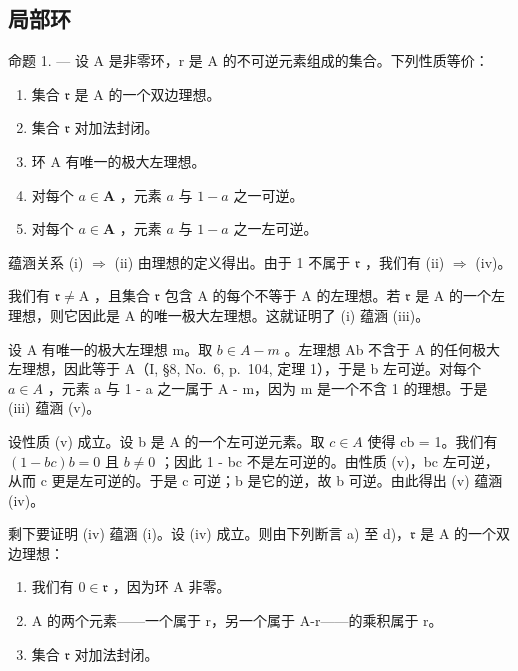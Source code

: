 \subsection{局部环}

命题 1. --- 设 A 是非零环，r 是 A 的不可逆元素组成的集合。下列性质等价：

\begin{enumerate}
\def\labelenumi{(\roman{enumi})}
\item
  集合 \(\mathfrak{r}\) 是 A 的一个双边理想。
\item
  集合 \(\mathfrak{r}\) 对加法封闭。
\item
  环 A 有唯一的极大左理想。
\item
  对每个 \(a \in \mathbf{A}\) ，元素 \(a\) 与 \(1 - a\) 之一可逆。
\item
  对每个 \(a \in \mathbf{A}\) ，元素 \(a\) 与 \(1 - a\) 之一左可逆。
\end{enumerate}

蕴涵关系 (i) \(\Rightarrow\) (ii) 由理想的定义得出。由于 1 不属于 \(\mathfrak{r}\) ，我们有 (ii) \(\Rightarrow\) (iv)。

我们有 \(\mathfrak{r} \neq \mathrm{A}\) ，且集合 \(\mathfrak{r}\) 包含 \(\mathrm{A}\) 的每个不等于 \(\mathrm{A}\) 的左理想。若 \(\mathfrak{r}\) 是 \(\mathrm{A}\) 的一个左理想，则它因此是 \(\mathrm{A}\) 的唯一极大左理想。这就证明了 (i) 蕴涵 (iii)。

设 A 有唯一的极大左理想 m。取 \(b \in A - m\) 。左理想 Ab 不含于 A 的任何极大左理想，因此等于 A（I, §8, No.~6, p.~104, 定理 1），于是 b 左可逆。对每个 \(a \in A\) ，元素 a 与 1 - a 之一属于 A - m，因为 m 是一个不含 1 的理想。于是 (iii) 蕴涵 (v)。

设性质 (v) 成立。设 b 是 A 的一个左可逆元素。取 \(c \in A\) 使得 cb = 1。我们有 \((1 - bc)b = 0\) 且 \(b \neq 0\) ；因此 1 - bc 不是左可逆的。由性质 (v)，bc 左可逆，从而 c 更是左可逆的。于是 c 可逆；b 是它的逆，故 b 可逆。由此得出 (v) 蕴涵 (iv)。

剩下要证明 (iv) 蕴涵 (i)。设 (iv) 成立。则由下列断言 a) 至 d)，\(\mathfrak{r}\) 是 A 的一个双边理想：

\begin{enumerate}
\def\labelenumi{\alph{enumi})}
\item
  我们有 \(0 \in \mathfrak{r}\) ，因为环 A 非零。
\item
  A 的两个元素——一个属于 r，另一个属于 A-r——的乘积属于 r。
\item
  集合 \(\mathfrak{r}\) 对加法封闭。
\end{enumerate}

